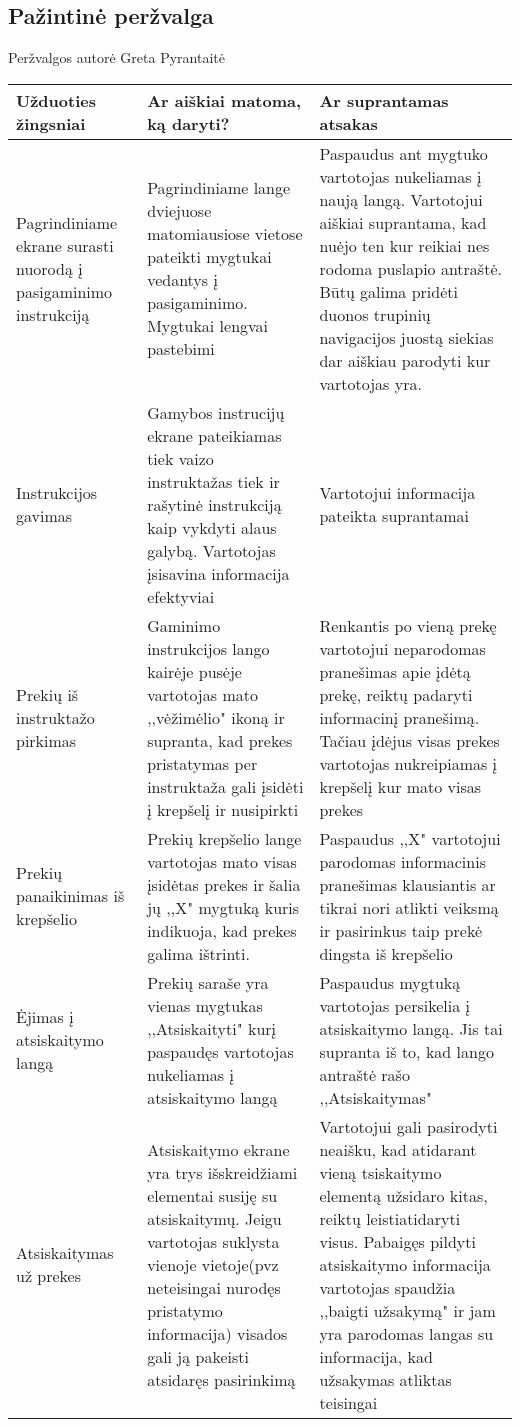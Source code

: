 \documentclass[oneside]{VUMIFPSkursinis}
\begin{document}
	\subsection{Pažintinė peržvalga}
Peržvalgos autorė Greta Pyrantaitė
\begin{center}
    \begin{tabular}{ |p{4cm}| p{6cm} | p{7cm} | }
    \hline
    	Užduoties žingsniai & Ar aiškiai matoma, ką daryti? & Ar suprantamas atsakas \\ \hline 
	Pagrindiniame ekrane surasti nuorodą į pasigaminimo instrukciją & Pagrindiniame lange dviejuose matomiausiose vietose pateikti mygtukai vedantys į pasigaminimo.
	Mygtukai lengvai pastebimi & Paspaudus ant mygtuko vartotojas nukeliamas į naują langą. 
	Vartotojui aiškiai suprantama, kad nuėjo ten kur reikiai nes rodoma puslapio antraštė. Būtų galima pridėti duonos trupinių navigacijos juostą siekias dar aiškiau parodyti kur vartotojas yra. \\ \hline
	Instrukcijos gavimas & Gamybos instrucijų ekrane pateikiamas tiek vaizo instruktažas tiek ir rašytinė instrukciją kaip vykdyti alaus galybą. Vartotojas įsisavina informacija efektyviai & Vartotojui informacija pateikta suprantamai \\ \hline
 	Prekių iš instruktažo pirkimas & Gaminimo instrukcijos lango kairėje pusėje vartotojas mato ,,vėžimėlio" ikoną ir supranta, kad prekes pristatymas per instruktaža gali įsidėti į krepšelį ir nusipirkti & Renkantis po vieną prekę vartotojui neparodomas pranešimas apie įdėtą prekę, reiktų padaryti informacinį pranešimą. Tačiau įdėjus visas prekes vartotojas nukreipiamas į krepšelį kur mato visas prekes \\ \hline
	Prekių panaikinimas iš krepšelio & Prekių krepšelio lange vartotojas mato visas įsidėtas prekes ir šalia jų ,,X" mygtuką kuris indikuoja, kad prekes galima ištrinti. & Paspaudus ,,X" vartotojui parodomas informacinis pranešimas klausiantis ar tikrai nori atlikti veiksmą ir pasirinkus taip prekė dingsta iš krepšelio \\ \hline
	Ėjimas į atsiskaitymo langą & Prekių saraše yra vienas mygtukas ,,Atsiskaityti" kurį paspaudęs vartotojas nukeliamas į atsiskaitymo langą & Paspaudus mygtuką vartotojas persikelia į atsiskaitymo langą. Jis tai supranta iš to, kad lango antraštė rašo ,,Atsiskaitymas" \\ \hline
	Atsiskaitymas už prekes & Atsiskaitymo ekrane yra trys išskreidžiami elementai susiję su atsiskaitymų. Jeigu vartotojas suklysta vienoje vietoje(pvz neteisingai nurodęs pristatymo informacija) visados gali ją pakeisti atsidaręs pasirinkimą & Vartotojui gali pasirodyti neaišku, kad atidarant vieną tsiskaitymo elementą užsidaro kitas, reiktų leistiatidaryti visus. Pabaigęs pildyti atsiskaitymo informacija vartotojas spaudžia ,,baigti užsakymą" ir jam yra parodomas langas su informacija, kad užsakymas atliktas teisingai \\ \hline

\end{tabular}
\end{center}
\end{document}
